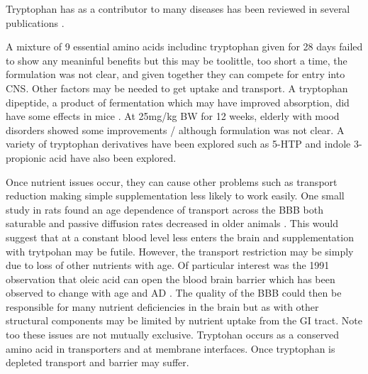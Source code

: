  
Tryptophan has as a contributor to many diseases has been reviewed
in several publications  
\cite{Poeggeler_Singh_Pappolla_Tryptophan_Nutrition_2022}
\cite{char_charvv261tarek_Chirumbolo_important_tryptophan_}.

A mixture of 9 essential amino acids includinc tryptophan given
for 28 days failed to show any meaninful benefits
\cite{Takada_Tanaka_Tanaka_Effects_essential_2022}
but this may be toolittle, too short a time, the formulation was not
clear, and given together they can compete for entry into CNS.
Other factors may be needed to get uptake and transport.
A tryptophan dipeptide, a product of fermentation which may have improved absorption,
did have some effects in mice \cite{PMC6555451}.
At 25mg/kg BW for 12 weeks, elderly with mood disorders showed some improvements
\cite{Chojnacki_charvv261siorowska_charvv322awski_Beneficial_Effect_Increased_2023}/
although formulation was not clear.
A variety of tryptophan derivatives have been explored such as 5-HTP
\cite{Adekunle_Balogun_Tryptophan_Supplementation_2025}
and indole 3-propionic acid 
\cite{Konopelski_Mogilnicka_Biological_Effects_Indole_2022}
have also been explored.

Once nutrient issues occur, they can cause other problems
such as transport reduction making simple supplementation less
likely to work easily. 
One small study in rats found an age dependence of transport
across the BBB both saturable and passive diffusion rates decreased
in older animals \cite{Tang1995}. This would suggest that at a constant
blood level less enters the brain and supplementation with trytpohan
may be futile. However, the transport restriction may be simply
due to loss of other nutrients with age. 
Of particular interest was the 1991 observation that oleic acid
can open the blood brain barrier 
\cite{Sztriha_Betz_Oleic_acid_reversibly_opens_1991}
which has been observed to change with age and AD 
\cite{PMC6866683}.
The quality of the BBB could then be responsible for many nutrient 
deficiencies in the brain but as with other structural components
may be limited by nutrient uptake from the GI tract.
Note too these issues are not mutually exclusive. Tryptohan occurs
as a conserved amino acid in transporters and at membrane
interfaces. Once tryptophan is depleted transport and barrier
may suffer. 


